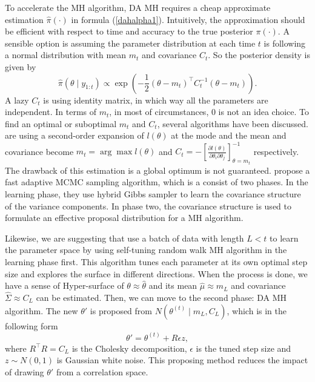 To accelerate the MH algorithm, DA MH requires a cheap approximate estimation $\hat{\pi}(\cdot)$ in formula (\ref{dahalpha1}). Intuitively, the approximation should be efficient with respect to time and accuracy to the true posterior $\pi(\cdot)$. A sensible option is assuming the parameter distribution at each time $t$ is following a normal distribution with mean $m_t$ and covariance $C_t$. So the posterior density is given by 
\begin{equation*}
\hat{\pi}(\theta\mid y_{1:t}) \propto \exp\left( -\frac{1}{2}(\theta-m_t)^\top C_t^{-1}(\theta-m_t)\right). 
\end{equation*}
A lazy $C_t$ is using identity matrix, in which way all the parameters are independent. In terms of $m_t$, in most of circumstances, 0 is not an idea choice. To find an optimal or suboptimal $m_t$ and $C_t$, several algorithms have been discussed. \cite{stroud2016bayesian} are using a second-order expansion of $l(\theta)$ at the mode and the mean and covariance become $m_t=\arg \max l(\theta)$ and $C_t = - \left[ \frac{\partial l(\theta)}{\partial \theta_i \partial \theta_j} \right]_{\theta=m_t}^{-1}$ respectively. The drawback of this estimation is a global optimum is not guaranteed. \cite{mathew2012bayesian} propose a fast adaptive MCMC sampling algorithm, which is a consist of two phases. In the learning phase, they use hybrid Gibbs sampler to learn the covariance structure of the variance components. In phase two, the covariance structure is used to formulate an effective proposal distribution for a MH algorithm. 


Likewise, we are suggesting that use a batch of data with length $L<t$ to learn the parameter space by using self-tuning random walk MH algorithm in the learning phase first. This algorithm tunes each parameter at its own optimal step size and explores the surface in different directions. When the process is done, we have a sense of Hyper-surface of $\theta\approx\hat{\theta}$ and its mean $\hat{\mu}\approx m_L$ and covariance $\hat{\Sigma}\approx C_L$ can be estimated. Then, we can move to the second phase: DA MH algorithm. The new $\theta'$ is proposed from  $N\left(\theta^{(t)}\mid m_L,C_L\right)$, which is in the following form 
\begin{equation}
\theta' = \theta^{(t)} + R\epsilon z,
\end{equation}
where $R^\top R = C_L$ is the Cholesky decomposition, $\epsilon$ is the tuned step size and $z\sim N(0,1)$ is Gaussian white noise. This proposing method reduces the impact of drawing $\theta'$ from a correlation space. 


